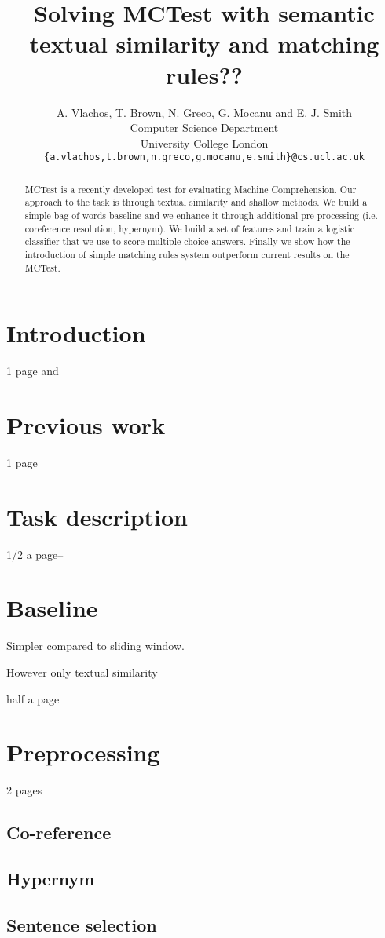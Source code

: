 \documentclass[11pt]{article}
\title{Solving MCTest with semantic textual similarity and matching rules??}
\author
       {A. Vlachos, T. Brown, N. Greco, G. Mocanu and E. J. Smith
       \\
       Computer Science Department\\
	University College London\\
       \tt{\{a.vlachos,t.brown,n.greco,g.mocanu,e.smith\}@cs.ucl.ac.uk}\\ 
       }
\date{}
\begin{document}
\maketitle
\begin{abstract}
MCTest is a recently developed test for evaluating Machine Comprehension. Our approach to the task is through textual similarity and shallow methods. We build a simple bag-of-words baseline and we enhance it through additional pre-processing (i.e. coreference resolution, hypernym). We build a set of features and train a logistic classifier that we use to score multiple-choice answers. Finally we show how the introduction of simple matching rules system outperform current results on the MCTest.
\end{abstract}

\section{Introduction}
1 page \cite{mctest} and 

\section{Previous work}
1 page

\section{Task description}
1/2 a page--

\section{Baseline}
Simpler compared to sliding window.

However only textual similarity

half a page
\section{Preprocessing}
2 pages
\subsection{Co-reference}
\subsection{Hypernym}
\subsection{Sentence selection}
\end{document}
